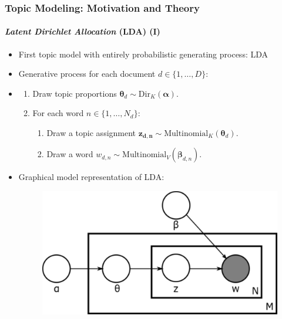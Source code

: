 \documentclass[xcolor=dvipsnames]{beamer}
\begin{document}
\begin{frame}
\frametitle{Topic Modeling: Motivation and Theory}
\framesubtitle{\textit{Latent Dirichlet Allocation} (LDA) (I)}
\begin{itemize}
\item First topic model with entirely probabilistic generating process: LDA \cite{blei2003latent}
\item Generative process for each document $d \in \{1,\dots,D\}$:
\item[] 
	\begin{enumerate}[{1)}]
	\item Draw topic proportions $\boldsymbol{\theta}_d \sim \text{Dir}_K(\boldsymbol{\alpha})$.
	\item For each word $n \in \{1,\dots,N_d\}$:
		\begin{enumerate}[{a)}]
		\item Draw a topic assignment $\boldsymbol{z_{d,n}} \sim \text{Multinomial}_K(\boldsymbol{\theta}_d)$.
		\item Draw a word $w_{d,n} \sim \text{Multinomial}_V(\boldsymbol{\beta}_{d,n})$.
	\end{enumerate}
\end{enumerate}
\item Graphical model representation of LDA: \cite{blei2003latent} 
	\begin{figure}[h!]
  	\centering
  	\hspace*{-1cm}\includegraphics[scale = 0.3]{../plots/presentation/lda_graphical.pdf}
	\end{figure}
\end{itemize}
\end{frame}
\end{document}
